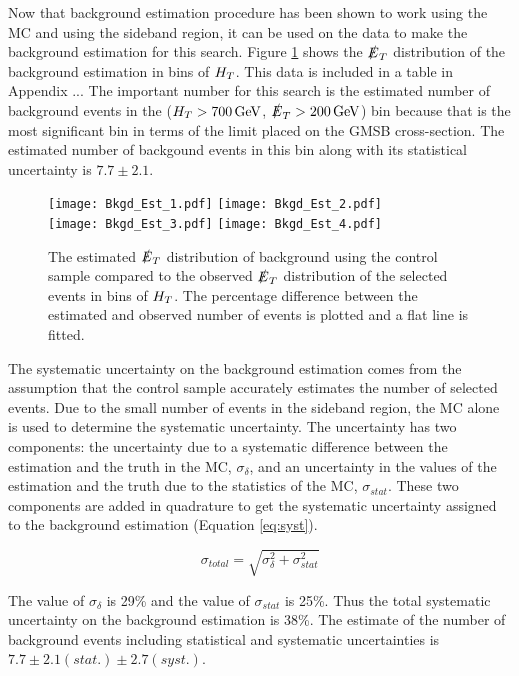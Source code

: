 Now that background estimation procedure has been shown to work using the MC and
using the sideband region, it can be used on the data to make the background
estimation for this search. Figure \ref{fig:Bkgd_Est} shows the $\slashed{E}_{T}$
distribution of the background estimation in bins of $H_{T}$. This data is
included in a table in Appendix ... The important number for this search is the
estimated number of background events in the ($H_{T}>700\, \mathrm{GeV}$, 
$\slashed{E}_{T}>200\, \mathrm{GeV}$) bin because that is the most significant bin in terms of
the limit placed on the GMSB cross-section. The estimated number of backgound
events in this bin along with its statistical uncertainty is $7.7\pm2.1$. \\

\begin{figure}
\texttt{[image: Bkgd\_Est\_1.pdf]}
\texttt{[image: Bkgd\_Est\_2.pdf]}\\
\texttt{[image: Bkgd\_Est\_3.pdf]}
\texttt{[image: Bkgd\_Est\_4.pdf]}\\
\caption{The estimated $\slashed{E}_{T}$ distribution of background using the control
sample compared to the observed $\slashed{E}_{T}$ distribution of the selected events in 
bins of $H_{T}$. The percentage difference between the estimated and observed
number of events is plotted and a flat line is fitted.}
\label{fig:Bkgd_Est}
\end{figure}

The systematic uncertainty on the background estimation comes from the assumption 
that the control sample accurately estimates the number of selected events. Due
to the small number of events in the sideband region, the MC alone is used to
determine the systematic uncertainty. The uncertainty has two components: the
uncertainty due to a systematic difference between the estimation and the truth 
in the MC, $\sigma_{\delta}$, and an uncertainty in the values of the estimation 
and the truth due to the statistics of the MC, $\sigma_{stat}$. These two 
components are added in quadrature to get the systematic uncertainty assigned to 
the background estimation (Equation \ref{eq:syst}).

\begin{equation}
\sigma_{total} = \sqrt{\sigma_{\delta}^{2} + \sigma_{stat}^{2}}
\label{eq:syst}
\end{equation}

The value of $\sigma_{\delta}$ is 29\unit{\%} and the value of $\sigma_{stat}$
is 25\unit{\%}. Thus the total systematic uncertainty on the background 
estimation is 38\unit{\%}. The estimate of the number of background events 
including statistical and systematic uncertainties is 
$7.7\pm2.1(stat.)\pm2.7(syst.)$.

